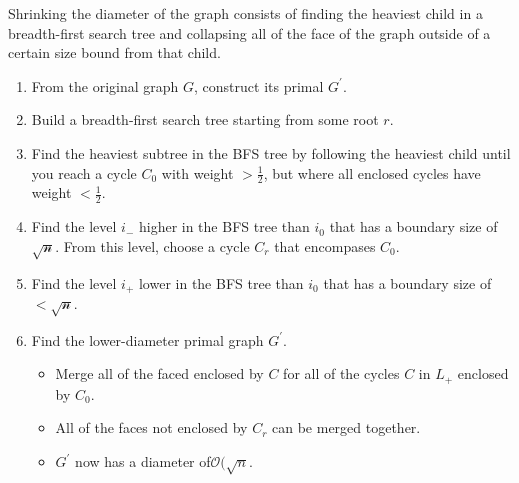 \documentclass[11pt]{article}
\newtheorem{lemma}[theorem]{Lemma}
\begin{document}


    Shrinking the diameter of the graph consists of finding the heaviest child in a breadth-first search tree and collapsing all of the face of the graph outside of a certain size bound from that child.
    \begin{enumerate}
      \item From the original graph $G$, construct its primal $G^{'}$.

      \item Build a breadth-first search tree starting from some root $r$.

      \item Find the heaviest subtree in the BFS tree by following the heaviest child until you reach a cycle $C_0$ with weight $> \frac{1}{2}$, but where all enclosed cycles have weight $< \frac{1}{2}$.

      \item Find the level $i_-$ higher in the BFS tree than $i_0$ that has a boundary size of $\mathcal{\sqrt{n}}$. From this level, choose a cycle $C_r$ that encompases $C_0$.

      \item Find the level $i_+$ lower in the BFS tree than $i_0$ that has  a boundary size of $< \mathcal{\sqrt{n}}$.

      \item Find the lower-diameter primal graph $G^{'}$.
      \begin{itemize}
        \item Merge all of the faced enclosed by $C$ for all of the cycles $C$ in $L_+$ enclosed by $C_0$.

        \item All of the faces not enclosed by $C_r$ can be merged together.

        \item $G^{'}$ now has a diameter of$\mathcal{O}(\sqrt{n}$.
      \end{itemize}
    \end{enumerate}
\end{document}
